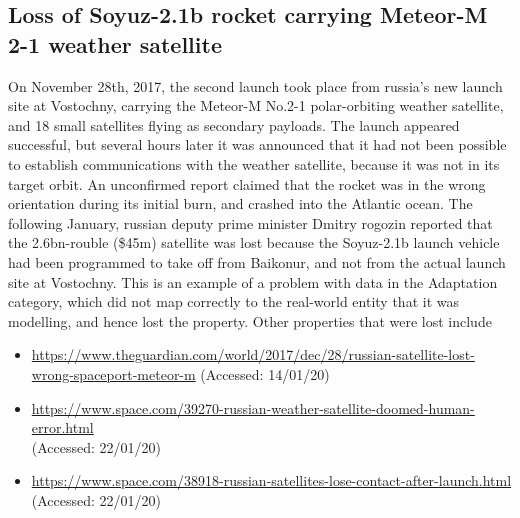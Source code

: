 \subsection{Loss of Soyuz-2.1b rocket carrying Meteor-M 2-1 weather satellite} \label{bkm:incacc:soyuz}
On November 28th, 2017, the second launch took place from russia's new launch site at Vostochny, carrying the Meteor-M No.2-1 polar-orbiting weather satellite, and 18 small satellites flying as secondary payloads. The launch appeared successful, but several hours later it was announced that it had not been possible to establish communications with the weather satellite, because it was not in its target orbit. An unconfirmed report claimed that the rocket was in the wrong orientation during its initial burn, and crashed into the Atlantic ocean.
The following January, russian deputy prime minister Dmitry rogozin reported that the 2.6bn-rouble (\$45m) satellite was lost because the Soyuz-2.1b launch vehicle had been programmed to take off from Baikonur, and not from the actual launch site at Vostochny. 
This is an example of a problem with data in the Adaptation category, which did not map correctly to the real-world entity that it was modelling, and hence lost the  property. Other properties that were lost include 

\begin{itemize}
  \item \raggedright{\href{https://www.theguardian.com/world/2017/dec/28/russian-satellite-lost-wrong-spaceport-meteor-m}{https://www.theguardian.com/world/2017/dec/28/russian-satellite-lost-wrong-spaceport-meteor-m} (Accessed: 14/01/20)}
  \item \raggedright{\href{https://www.space.com/39270-russian-weather-satellite-doomed-human-error.html}{https://www.space.com/39270-russian-weather-satellite-doomed-human-error.html} \\(Accessed: 22/01/20)}
  \item \raggedright{\href{https://www.space.com/38918-russian-satellites-lose-contact-after-launch.html}{https://www.space.com/38918-russian-satellites-lose-contact-after-launch.html} \\(Accessed: 22/01/20)}
\end{itemize}
%
%
